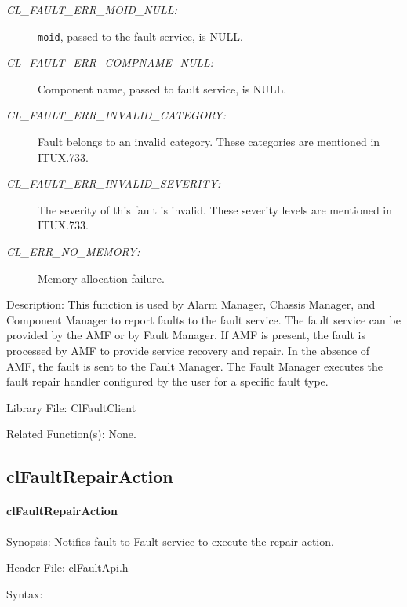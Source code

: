 \begin{flushleft}
\begin{Desc}
\begin{description}
\item[{\em CL\_\-FAULT\_\-ERR\_\-MOID\_\-NULL:}]{\tt{moid}}, passed to the fault service, is NULL. 
\item[{\em CL\_\-FAULT\_\-ERR\_\-COMPNAME\_\-NULL:}]Component name,  passed to fault service, is NULL. 
\item[{\em CL\_\-FAULT\_\-ERR\_\-INVALID\_\-CATEGORY:}]Fault belongs to an invalid category. These categories are mentioned in ITUX.733. 
\item[{\em CL\_\-FAULT\_\-ERR\_\-INVALID\_\-SEVERITY:}]The severity of this fault is invalid. These severity levels are mentioned in ITUX.733. 
\item[{\em CL\_\-ERR\_\-NO\_\-MEMORY:}]Memory allocation failure.\end{description}
\end{Desc}
\begin{Desc}
\item[Description:]This function is used by Alarm Manager, Chassis Manager, and Component Manager to report faults to the fault service. The fault
service can be provided by the AMF or by Fault Manager. If AMF is present, the fault is processed by AMF to provide service
recovery and repair. In the absence of AMF, the fault is sent to the Fault Manager. The Fault Manager executes the fault repair handler
configured by the user for a specific fault type.\end{Desc}
\begin{Desc}
\item[Library File:]Cl\-Fault\-Client\end{Desc}
\begin{Desc}
\item[Related Function(s):]None. \end{Desc}
\newpage


\subsection{clFaultRepairAction}
\hypertarget{pageFault Manager105}{}\paragraph{cl\-Fault\-Repair\-Action}\label{pageFault Manager105}
\begin{Desc}
\item[Synopsis:]Notifies fault to Fault service to execute the repair action.\end{Desc}
\begin{Desc}
\item[Header File:]clFaultApi.h\end{Desc}
\begin{Desc}
\item[Syntax:]


\end{Desc}
\end{flushleft}
